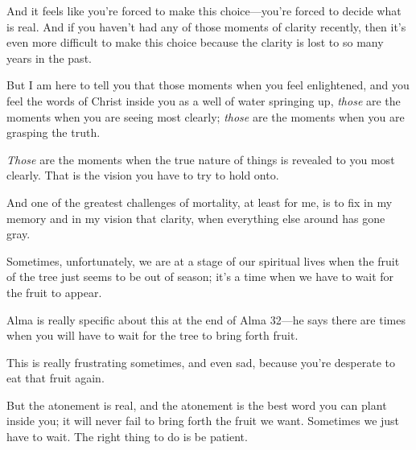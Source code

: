 \begin{compactitem}
\begin{compactitem}
					\item And it feels like you're forced to make this choice---you're forced to decide what is real. And if you haven't had any of those moments of clarity recently, then it's even more difficult to make this choice because the clarity is lost to so many years in the past.
					\item But I am here to tell you that those moments when you feel enlightened, and you feel the words of Christ inside you as a well of water springing up, \textit{those} are the moments when you are seeing most clearly; \textit{those} are the moments when you are grasping the truth.
					\item \textit{Those} are the moments when the true nature of things is revealed to you most clearly. That is the vision you have to try to hold onto.
					\item And one of the greatest challenges of mortality, at least for me, is to fix in my memory and in my vision that clarity, when everything else around has gone gray.
					\item Sometimes, unfortunately, we are at a stage of our spiritual lives when the fruit of the tree just seems to be out of season; it's a time when we have to wait for the fruit to appear.
					\item Alma is really specific about this at the end of Alma 32---he says there are times when you will have to wait for the tree to bring forth fruit.
					\item This is really frustrating sometimes, and even sad, because you're desperate to eat that fruit again.
					\item But the atonement is real, and the atonement is the best word you can plant inside you; it will never fail to bring forth the fruit we want. Sometimes we just have to wait. The right thing to do is be patient.
				\end{compactitem}
						
		\end{compactitem}
				
				
			
